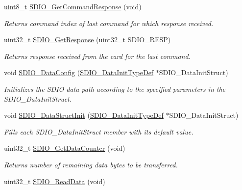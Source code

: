 \begin{DoxyCompactItemize}
uint8\+\_\+t \hyperlink{group___s_d_i_o___private___functions_ga9badf271c818e09da301d715c4ad0e5b}{S\+D\+I\+O\+\_\+\+Get\+Command\+Response} (void)
\begin{DoxyCompactList}\small\item\em Returns command index of last command for which response received. \end{DoxyCompactList}\item 
uint32\+\_\+t \hyperlink{group___s_d_i_o___private___functions_ga5c1e859511840e8cca6a9a768bce220b}{S\+D\+I\+O\+\_\+\+Get\+Response} (uint32\+\_\+t S\+D\+I\+O\+\_\+\+R\+E\+SP)
\begin{DoxyCompactList}\small\item\em Returns response received from the card for the last command. \end{DoxyCompactList}\item 
void \hyperlink{group___s_d_i_o___private___functions_gad65d896ae919683585bda44a1e2afae4}{S\+D\+I\+O\+\_\+\+Data\+Config} (\hyperlink{struct_s_d_i_o___data_init_type_def}{S\+D\+I\+O\+\_\+\+Data\+Init\+Type\+Def} $\ast$S\+D\+I\+O\+\_\+\+Data\+Init\+Struct)
\begin{DoxyCompactList}\small\item\em Initializes the S\+D\+IO data path according to the specified parameters in the S\+D\+I\+O\+\_\+\+Data\+Init\+Struct. \end{DoxyCompactList}\item 
void \hyperlink{group___s_d_i_o___private___functions_gaa83209c09e921521aca2587fb5b22ea2}{S\+D\+I\+O\+\_\+\+Data\+Struct\+Init} (\hyperlink{struct_s_d_i_o___data_init_type_def}{S\+D\+I\+O\+\_\+\+Data\+Init\+Type\+Def} $\ast$S\+D\+I\+O\+\_\+\+Data\+Init\+Struct)
\begin{DoxyCompactList}\small\item\em Fills each S\+D\+I\+O\+\_\+\+Data\+Init\+Struct member with its default value. \end{DoxyCompactList}\item 
uint32\+\_\+t \hyperlink{group___s_d_i_o___private___functions_ga7a28aaa2c25a9a5a8db1f49b0e8c9d0a}{S\+D\+I\+O\+\_\+\+Get\+Data\+Counter} (void)
\begin{DoxyCompactList}\small\item\em Returns number of remaining data bytes to be transferred. \end{DoxyCompactList}\item 
uint32\+\_\+t \hyperlink{group___s_d_i_o___private___functions_ga4e8ac755ef3c31ecd4ed2708df19187e}{S\+D\+I\+O\+\_\+\+Read\+Data} (void)

\end{DoxyCompactItemize}
